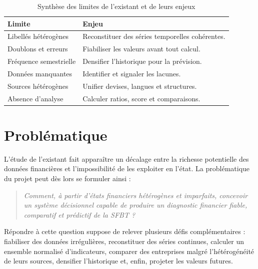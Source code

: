 \begin{table}[H]
  \centering
  \caption[Synthèse des limites de l'existant]{Synthèse des limites de l'existant et de leurs enjeux}
  \label{tab:limites}
  \begin{tabular}{|p{5cm}|p{8.5cm}|}
    \hline
    \textbf{Limite} & \textbf{Enjeu} \\ \hline
    Libellés hétérogènes & Reconstituer des séries temporelles cohérentes. \\ \hline
    Doublons et erreurs & Fiabiliser les valeurs avant tout calcul. \\ \hline
    Fréquence semestrielle & Densifier l'historique pour la prévision. \\ \hline
    Données manquantes & Identifier et signaler les lacunes. \\ \hline
    Sources hétérogènes & Unifier devises, langues et structures. \\ \hline
    Absence d'analyse & Calculer ratios, score et comparaisons. \\ \hline
  \end{tabular}
\end{table}

\section{Problématique}
\label{sec:probleme}
\par L'étude de l'existant fait apparaître un décalage entre la richesse
potentielle des données financières et l'impossibilité de les exploiter en
l'état. La problématique du projet peut dès lors se formuler ainsi :

\begin{quote}
\itshape Comment, à partir d'états financiers hétérogènes et imparfaits,
concevoir un système décisionnel capable de produire un diagnostic financier
fiable, comparatif et prédictif de la \ac{SFBT} ?
\end{quote}

\par Répondre à cette question suppose de relever plusieurs défis complémentaires :
fiabiliser des données irrégulières, reconstituer des séries continues, calculer
un ensemble normalisé d'indicateurs, comparer des entreprises malgré
l'hétérogénéité de leurs sources, densifier l'historique et, enfin, projeter les
valeurs futures.


